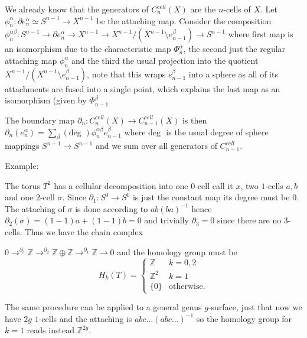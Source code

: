 We already know that the generators of \(C^{cell}_n(X)\) are the \( n \)-cells of \( X \).
Let \( \phi^\alpha_n : \partial e^\alpha_n \simeq S^{n-1} \to X^{n-1} \) be the attaching map.
Consider the composition
\( \phi^{\alpha \beta}_n : S^{n-1} \to \partial e^\alpha_n \to X^{n-1} \to X^{n-1} / (X^{n-1} \setminus e^\beta_{n-1}) \to S^{n-1} \)
where first map is an isomorphism due to the characteristic map \( \Phi^\alpha_n \), the second just the regular attaching map \( \phi^\alpha_n \)
and the third the usual projection into the quotient \( X^{n-1} / (X^{n-1} \setminus e^\beta_{n-1}) \), note that this wraps \( e^\beta_{n-1} \)
into a sphere as all of its attachments are fused into a single point, which explains the last map as an isomorphism (given by \( \Phi^\beta_{n-1} \)

The boundary map \( \partial_n : C^{cell}_n(X) \to C^{cell}_{n-1}(X)\) 
is then
\( \partial_n(e^\alpha_n) = \sum_\beta (\text{deg }) \phi_n^{\alpha\beta} e^\beta_{n-1} \)
where \( \text{deg } \) is the usual degree of sphere mappings \( S^{n-1} \to S^{n-1} \) and we sum
over all generators of \( C^{cell}_{n-1} \).

Example:

The torus \( T^2 \) has a cellular decomposition into one \( 0 \)-cell call it \( x \), two \( 1 \)-cells \( a,b \) and one \( 2 \)-cell \( \sigma \).
Since \( \partial_1 : S^{0} \to S^0 \) is just the constant map its degree must be \( 0 \). 
The attaching of \( \sigma \) is done according to \( ab(ba)^{-1} \) hence \( \partial_2(\sigma) = (1 - 1)a + (1 - 1)b = 0 \) and trivially
\( \partial_3 = 0 \) since there are no \( 3 \)-cells. Thus we have the chain complex

\( 0 \to^{\partial_3} \mathbb{Z} \to^{\partial_2} \mathbb{Z} \oplus \mathbb{Z} \to^{\partial_1} \mathbb{Z} \to 0\)
and the homology group must be
\[
H_k(T) = \begin{cases} 
\mathbb{Z} & k = 0,2 \\ \mathbb{Z}^2 & k = 1 \\ \{0\} & \text{otherwise.} 
\end{cases}
\]

The same procedure can be applied to a general genus \( g \)-surface, just that now we have \( 2g \) \(1\)-cells and the attaching is \( abc\dots(abc\dots)^{-1} \)
so the homology group for \( k=1 \) reads instead \( \mathbb{Z}^{2g} \).
